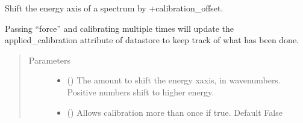\documentclass[a4paper,10pt,english]{sphinxmanual}
\begin{document}
\begin{fulllineitems}
\begin{fulllineitems}

\begin{fulllineitems}
\label{\detokenize{sfgtools:sfgtools.SFGProcessTools.SFGDataStore.calibrate_spectrum}}
\sphinxAtStartPar
Shift the energy axis of a spectrum by +calibration\_offset.

\sphinxAtStartPar
Passing “force” and calibrating multiple times will update the applied\_calibration attribute
of datastore to keep track of what has been done.
\begin{quote}\begin{description}
\item[{Parameters}] \leavevmode\begin{itemize}
\item {} 
\sphinxAtStartPar
{} () \textendash{} The amount to shift the energy xaxis, in wavenumbers. Positive numbers shift to higher energy.

\item {} 
\sphinxAtStartPar
{} (\sphinxstyleliteralemphasis{\sphinxupquote{, }}) \textendash{} Allows calibration more than once if true. Default False

\end{itemize}

\end{description}\end{quote}

\end{fulllineitems}


\begin{fulllineitems}
\label{\detokenize{sfgtools:sfgtools.SFGProcessTools.SFGDataStore.calibrated}}
\end{fulllineitems}


\end{fulllineitems}
\end{fulllineitems}
\end{document}
